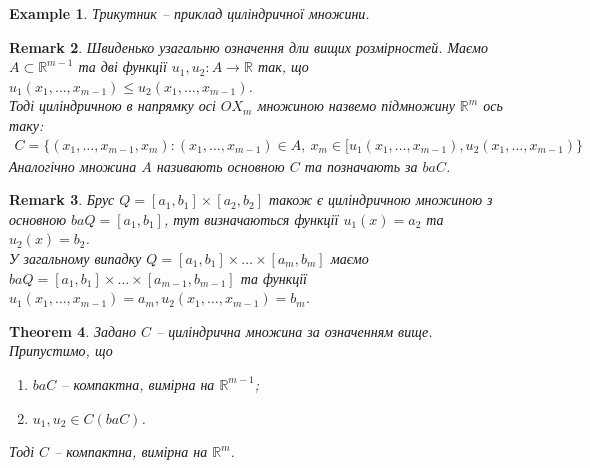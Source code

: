 \documentclass[a4paper, 10pt]{article}
\theoremstyle{theoremdd}
\newtheorem{theorem}{Theorem}[subsection]
\theoremstyle{theoremdd}
\theoremstyle{theoremdd}
\theoremstyle{theoremdd}
\newtheorem{example}[theorem]{Example}
\theoremstyle{theoremdd}
\theoremstyle{theoremdd}
\newtheorem{remark}[theorem]{Remark}
\theoremstyle{theoremdd}
\theoremstyle{theoremdd}
\begin{document}
\begin{example}
Трикутник -- приклад циліндричної множини.
\end{example}

\begin{remark}
Швиденько узагальню означення дли вищих розмірностей. Маємо $A \subset \mathbb{R}^{m-1}$ та дві функції $u_1,u_2 \colon A \to \mathbb{R}$ так, що $u_1(x_1,\dots,x_{m-1}) \leq u_2(x_1,\dots,x_{m-1})$. \\
Тоді циліндричною в напрямку осі $OX_m$ множиною назвемо підмножину $\mathbb{R}^m$ ось таку:
\begin{align*}
C = \{ (x_1,\dots,x_{m-1},x_m): (x_1,\dots,x_{m-1}) \in A,\ x_m \in [u_1(x_1,\dots,x_{m-1}),u_2(x_1,\dots,x_{m-1}) \}
\end{align*}
Аналогічно множина $A$ називають основною $C$ та позначають за $baC$.
\end{remark}

\begin{remark}
Брус $Q = [a_1,b_1] \times [a_2,b_2]$ також є циліндричною множиною з основною $baQ = [a_1,b_1]$, тут визначаються функції $u_1(x) = a_2$ та $u_2(x) = b_2$.\\
У загальному випадку $Q = [a_1,b_1] \times \dots \times [a_m,b_m]$ маємо $baQ = [a_1,b_1] \times \dots \times [a_{m-1},b_{m-1}]$ та функції $u_1(x_1,\dots,x_{m-1}) = a_m, u_2(x_1,\dots,x_{m-1}) = b_m$.
\end{remark}

\begin{theorem}
Задано $C$ -- циліндрична множина за означенням вище. Припустимо, що
\begin{enumerate}[nosep,wide=0pt,label={\arabic*)}]
\item $ba C$ -- компактна, вимірна на $\mathbb{R}^{m-1}$;
\item $u_1,u_2 \in C(ba C)$.
\end{enumerate}
Тоді $C$ -- компактна, вимірна на $\mathbb{R}^m$.
\end{theorem}
\end{document}
